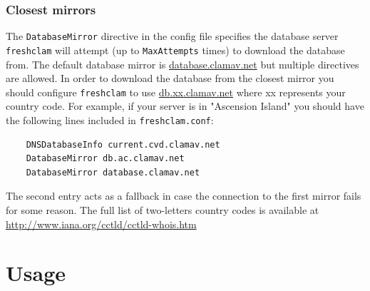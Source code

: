 \documentclass[a4paper,titlepage,12pt]{article}
\begin{document}
    \subsubsection{Closest mirrors}
    The \verb+DatabaseMirror+ directive in the config file specifies the
    database server \verb+freshclam+ will attempt (up to \verb+MaxAttempts+
    times) to download the database from. The default database mirror
    is \url{database.clamav.net} but multiple directives are allowed.
    In order to download the database from the closest mirror you should  
    configure \verb+freshclam+ to use \url{db.xx.clamav.net} where xx
    represents your country code. For example, if your server is in "Ascension
    Island" you should have the following lines included in \verb+freshclam.conf+:
    \begin{verbatim}
	DNSDatabaseInfo current.cvd.clamav.net
	DatabaseMirror db.ac.clamav.net
	DatabaseMirror database.clamav.net
    \end{verbatim}
    The second entry acts as a fallback in case the connection to the first
    mirror fails for some reason. The full list of two-letters country codes
    is available at \url{http://www.iana.org/cctld/cctld-whois.htm}

    \section{Usage}
\end{document}
